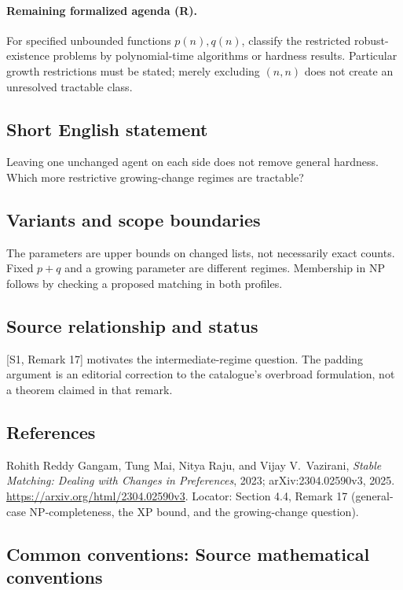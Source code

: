 \documentclass[11pt,a4paper]{article}
\begin{document}
\paragraph{Remaining formalized agenda (R).}
For specified unbounded functions \(p(n),q(n)\), classify the restricted
robust-existence problems by polynomial-time algorithms or hardness
results. Particular growth restrictions must be stated; merely excluding
\((n,n)\) does not create an unresolved tractable class.

\subsection*{Short English statement}
Leaving one unchanged agent on each side does not remove general hardness.
Which more restrictive growing-change regimes are tractable?

\subsection*{Variants and scope boundaries}
The parameters are upper bounds on changed lists, not necessarily exact
counts. Fixed \(p+q\) and a growing parameter are different regimes.
Membership in NP follows by checking a proposed matching in both profiles.

\subsection*{Source relationship and status}
[S1, Remark 17] motivates the intermediate-regime question.
The padding argument is an editorial correction to the catalogue's
overbroad formulation, not a theorem claimed in that remark.

\subsection*{References}
\begingroup\footnotesize\raggedright
\noindent[S1] Rohith Reddy Gangam, Tung Mai, Nitya Raju, and
Vijay V.~Vazirani,
\emph{Stable Matching: Dealing with Changes in Preferences}, 2023;
arXiv:2304.02590v3, 2025.
\url{https://arxiv.org/html/2304.02590v3}.
Locator: Section 4.4, Remark 17 (general-case NP-completeness,
the XP bound, and the growing-change question).
\par\endgroup

\subsection*{Common conventions: Source mathematical conventions}
\end{document}
